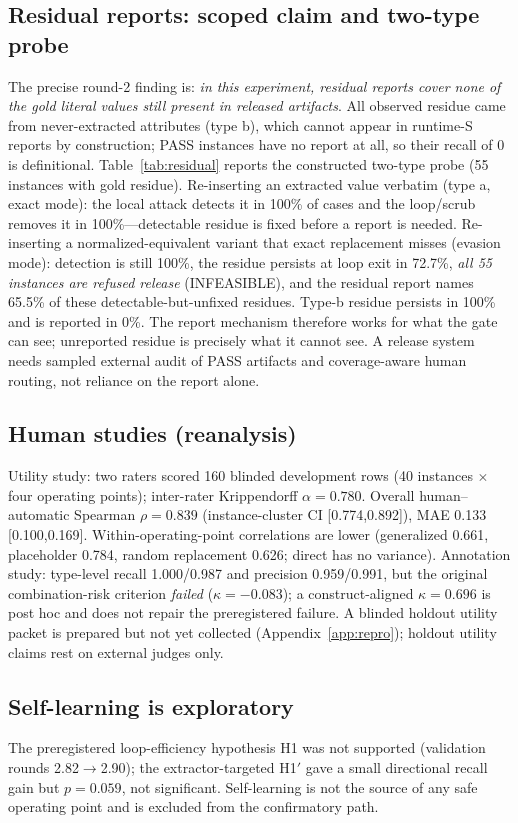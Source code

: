 \documentclass[11pt,a4paper]{article}
\begin{document}
\subsection{Residual reports: scoped claim and two-type probe}\label{sec:res-residual}
The precise round-2 finding is: \emph{in this experiment, residual reports cover none of the gold literal values still present in released artifacts}. All observed residue came from never-extracted attributes (type b), which cannot appear in runtime-S reports by construction; PASS instances have no report at all, so their recall of 0 is definitional. Table~\ref{tab:residual} reports the constructed two-type probe (55 instances with gold residue). Re-inserting an extracted value verbatim (type a, exact mode): the local attack detects it in 100\% of cases and the loop/scrub removes it in 100\%---detectable residue is fixed before a report is needed. Re-inserting a normalized-equivalent variant that exact replacement misses (evasion mode): detection is still 100\%, the residue persists at loop exit in 72.7\%, \emph{all 55 instances are refused release} (INFEASIBLE), and the residual report names 65.5\% of these detectable-but-unfixed residues. Type-b residue persists in 100\% and is reported in 0\%. The report mechanism therefore works for what the gate can see; unreported residue is precisely what it cannot see. A release system needs sampled external audit of PASS artifacts and coverage-aware human routing, not reliance on the report alone.

\subsection{Human studies (reanalysis)}
Utility study: two raters scored 160 blinded development rows (40 instances $\times$ four operating points); inter-rater Krippendorff $\alpha=0.780$. Overall human--automatic Spearman $\rho=0.839$ (instance-cluster CI [0.774,0.892]), MAE 0.133 [0.100,0.169]. Within-operating-point correlations are lower (generalized 0.661, placeholder 0.784, random replacement 0.626; direct has no variance). Annotation study: type-level recall 1.000/0.987 and precision 0.959/0.991, but the original combination-risk criterion \emph{failed} ($\kappa=-0.083$); a construct-aligned $\kappa=0.696$ is post hoc and does not repair the preregistered failure. A blinded holdout utility packet is prepared but not yet collected (Appendix~\ref{app:repro}); holdout utility claims rest on external judges only.

\subsection{Self-learning is exploratory}
The preregistered loop-efficiency hypothesis H1 was not supported (validation rounds 2.82$\to$2.90); the extractor-targeted H1$'$ gave a small directional recall gain but $p=0.059$, not significant. Self-learning is not the source of any safe operating point and is excluded from the confirmatory path.
\end{document}
